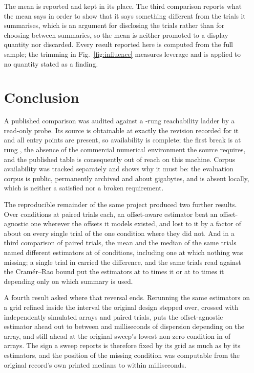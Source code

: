 The mean is reported and kept in its place. The third comparison reports what
the mean says in order to show that it says something different from the trials
it summarises, which is an argument for disclosing the trials rather than for
choosing between summaries, so the mean is neither promoted to a display
quantity nor discarded. Every result reported here is computed from the full
sample; the trimming in Fig.~\ref{fig:influence} measures leverage and is
applied to no quantity stated as a finding.

\section{Conclusion}

A published comparison was audited against a \NRungs{}-rung reachability ladder
by a read-only probe. Its source is obtainable at exactly the revision recorded
for it and all \EntryPoints{} entry points are present, so availability is
complete; the first break is at rung \FirstBreak{}, the absence of the
commercial numerical environment the source requires, and the published table is
consequently out of reach on this machine. Corpus availability was tracked
separately and shows why it must be: the evaluation corpus is public, permanently
archived and about \CorpusGB{} gigabytes, and is absent locally, which is
neither a satisfied nor a broken requirement.

The reproducible remainder of the same project produced two further results.
Over \NConditions{} conditions at \NTrials{} paired trials each, an offset-aware
estimator beat an offset-agnostic one wherever the offsets it models existed,
and lost to it by a factor of about \ZeroRatio{} on every single trial of the
one condition where they did not. And in a third comparison of \CxPlanned{}
paired trials, the mean and the median of the same trials named different
estimators at \CxDisagreeing{} of \CxConditions{} conditions, including one at
which nothing was missing; a single trial in \CxTrialsPerCondition{} carried the
difference, and the same trials read against the Cram\'er--Rao bound put the
estimators at \CxEffMeanLow{} to \CxEffMeanHigh{} times it or at
\CxEffMedianLow{} to \CxEffMedianHigh{} times it depending only on which summary
is used.

A fourth result asked where that reversal ends. Rerunning the same estimators on
a grid refined inside the interval the original design stepped over, crossed
with \FineRooms{} independently simulated arrays and \FinePairs{} paired trials,
puts the offset-agnostic estimator ahead out to between \ReversalLow{} and
\ReversalHigh{} milliseconds of dispersion depending on the array, and still
ahead at the original sweep's lowest non-zero condition in
\AnchorAgnosticRooms{} of \FineRooms{} arrays. The sign a sweep reports is
therefore fixed by its grid as much as by its estimators, and the position of
the missing condition was computable from the original record's own printed
medians to within \PredictionError{} milliseconds.

